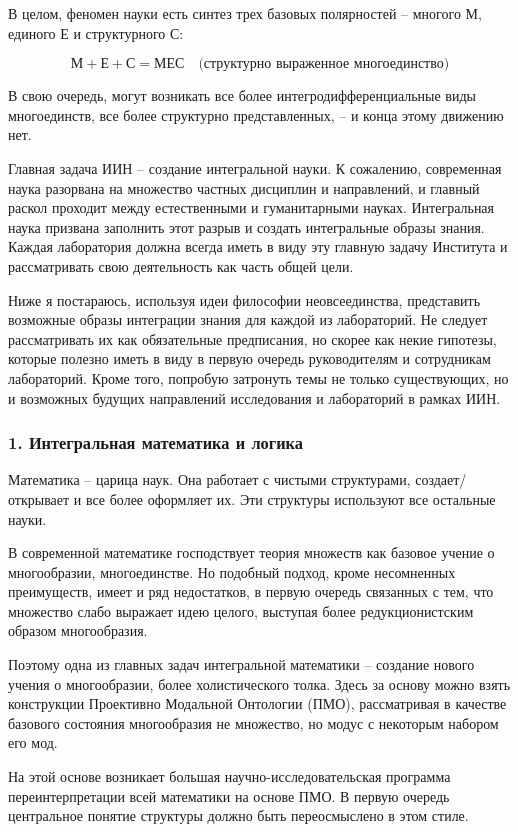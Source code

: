     В целом, феномен науки есть синтез трех базовых полярностей – многого М, единого Е и структурного С:

    \[
    \text{М} + \text{Е} + \text{С} = \text{МЕС} \quad \text{(структурно выраженное многоединство)}
    \]

    В свою очередь, могут возникать все более интегродифференциальные виды многоединств, все более структурно представленных, – и конца этому движению нет.

    Главная задача ИИН – создание интегральной науки. К сожалению, современная наука разорвана на множество частных дисциплин и направлений, и главный раскол проходит между естественными и гуманитарными науках. Интегральная наука призвана заполнить этот разрыв и создать интегральные образы знания. Каждая лаборатория должна всегда иметь в виду эту главную задачу Института и рассматривать свою деятельность как часть общей цели.

    Ниже я постараюсь, используя идеи философии неовсеединства, представить возможные образы интеграции знания для каждой из лабораторий. Не следует рассматривать их как обязательные предписания, но скорее как некие гипотезы, которые полезно иметь в виду в первую очередь руководителям и сотрудникам лабораторий. Кроме того, попробую затронуть темы не только существующих, но и возможных будущих направлений исследования и лабораторий в рамках ИИН.

    \subsubsection*{1. Интегральная математика и логика}
    Математика – царица наук. Она работает с чистыми структурами, создает/открывает и все более оформляет их. Эти структуры используют все остальные науки.

    В современной математике господствует теория множеств как базовое учение о многообразии, многоединстве. Но подобный подход, кроме несомненных преимуществ, имеет и ряд недостатков, в первую очередь связанных с тем, что множество слабо выражает идею целого, выступая более редукционистским образом многообразия.

    Поэтому одна из главных задач интегральной математики – создание нового учения о многообразии, более холистического толка. Здесь за основу можно взять конструкции Проективно Модальной Онтологии (ПМО), рассматривая в качестве базового состояния многообразия не множество, но модус с некоторым набором его мод.

    На этой основе возникает большая научно-исследовательская программа переинтерпретации всей математики на основе ПМО. В первую очередь центральное понятие структуры должно быть переосмыслено в этом стиле.

